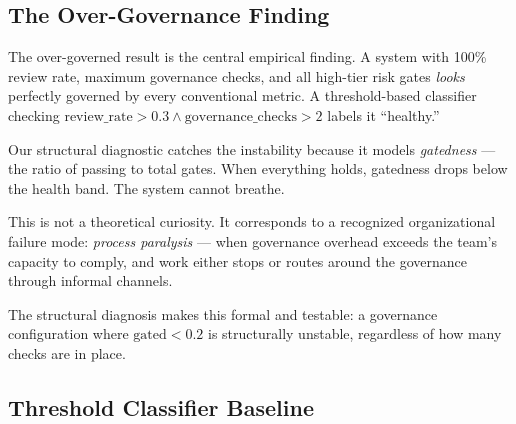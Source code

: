 \documentclass[sigconf,nonacm]{acmart}
\begin{document}
\subsection{The Over-Governance Finding}

The over-governed result is the central empirical finding. A system with
100\% review rate, maximum governance checks, and all high-tier risk gates
\emph{looks} perfectly governed by every conventional metric. A
threshold-based classifier checking
$\mathrm{review\_rate} > 0.3 \wedge \mathrm{governance\_checks} > 2$
labels it ``healthy.''

Our structural diagnostic catches the instability because it models
\emph{gatedness} --- the ratio of passing to total gates. When everything
holds, gatedness drops below the health band. The system cannot breathe.

This is not a theoretical curiosity. It corresponds to a recognized
organizational failure mode: \emph{process paralysis} --- when governance
overhead exceeds the team's capacity to comply, and work either stops
or routes around the governance through informal channels.

The structural diagnosis makes this formal and testable: a governance
configuration where $\mathrm{gated} < 0.2$ is structurally unstable,
regardless of how many checks are in place.

\subsection{Threshold Classifier Baseline}
\end{document}

